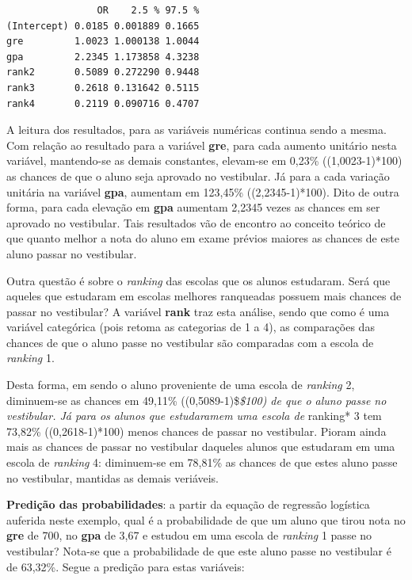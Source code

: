 \documentclass[12pt,brazil,oneside]{book}
\newenvironment{Shaded}{\begin{snugshade}}{\end{snugshade}}
\newcommand{\DataTypeTok}[1]{\textcolor[rgb]{0.13,0.29,0.53}{#1}}
\newcommand{\DecValTok}[1]{\textcolor[rgb]{0.00,0.00,0.81}{#1}}
\newcommand{\FloatTok}[1]{\textcolor[rgb]{0.00,0.00,0.81}{#1}}
\newcommand{\KeywordTok}[1]{\textcolor[rgb]{0.13,0.29,0.53}{\textbf{#1}}}
\newcommand{\NormalTok}[1]{#1}
\newcommand{\OperatorTok}[1]{\textcolor[rgb]{0.81,0.36,0.00}{\textbf{#1}}}
\newcommand{\StringTok}[1]{\textcolor[rgb]{0.31,0.60,0.02}{#1}}
\begin{document}
\begin{verbatim}
                OR    2.5 % 97.5 %
(Intercept) 0.0185 0.001889 0.1665
gre         1.0023 1.000138 1.0044
gpa         2.2345 1.173858 4.3238
rank2       0.5089 0.272290 0.9448
rank3       0.2618 0.131642 0.5115
rank4       0.2119 0.090716 0.4707
\end{verbatim}

A leitura dos resultados, para as variáveis numéricas continua sendo a
mesma. Com relação ao resultado para a variável \textbf{gre}, para cada
aumento unitário nesta variável, mantendo-se as demais constantes,
elevam-se em 0,23\% ((1,0023-1)*100) as chances de que o aluno seja
aprovado no vestibular. Já para a cada variação unitária na variável
\textbf{gpa}, aumentam em 123,45\% ((2,2345-1)*100). Dito de outra
forma, para cada elevação em \textbf{gpa} aumentam 2,2345 vezes as
chances em ser aprovado no vestibular. Tais resultados vão de encontro
ao conceito teórico de que quanto melhor a nota do aluno em exame
prévios maiores as chances de este aluno passar no vestibular.

Outra questão é sobre o \emph{ranking} das escolas que os alunos
estudaram. Será que aqueles que estudaram em escolas melhores ranqueadas
possuem mais chances de passar no vestibular? A variável \textbf{rank}
traz esta análise, sendo que como é uma variável categórica (pois retoma
as categorias de 1 a 4), as comparações das chances de que o aluno passe
no vestibular são comparadas com a escola de \emph{ranking} 1.

Desta forma, em sendo o aluno proveniente de uma escola de
\emph{ranking} 2, diminuem-se as chances em 49,11\%
((0,5089-1)\$\emph{\$100) de que o aluno passe no vestibular. Já para os
alunos que estudaramem uma escola de }ranking* 3 tem 73,82\%
((0,2618-1)*100) menos chances de passar no vestibular. Pioram ainda
mais as chances de passar no vestibular daqueles alunos que estudaram em
uma escola de \emph{ranking} 4: diminuem-se em 78,81\% as chances de que
estes aluno passe no vestibular, mantidas as demais veriáveis.

\textbf{Predição das probabilidades}: a partir da equação de regressão
logística auferida neste exemplo, qual é a probabilidade de que um aluno
que tirou nota no \textbf{gre} de 700, no \textbf{gpa} de 3,67 e estudou
em uma escola de \emph{ranking} 1 passe no vestibular? Nota-se que a
probabilidade de que este aluno passe no vestibular é de 63,32\%. Segue
a predição para estas variáveis:

\begin{Shaded}
\end{Shaded}
\end{document}
